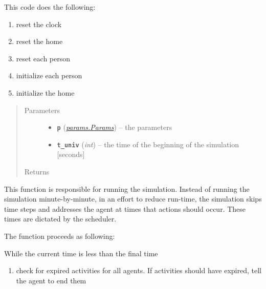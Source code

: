 \documentclass[letterpaper,10pt,english]{sphinxmanual}
\begin{document}
\begin{fulllineitems}
\begin{fulllineitems}
This code does the following:
\begin{enumerate}
\item {} 
reset the clock

\item {} 
reset the home

\item {} 
reset each person

\item {} 
initialize each person

\item {} 
initialize the home

\end{enumerate}
\begin{quote}\begin{description}
\item[{Parameters}] \leavevmode\begin{itemize}
\item {} 
\textbf{\texttt{p}} ({\hyperref[params:params.Params]{\emph{\emph{params.Params}}}}) -- the parameters

\item {} 
\textbf{\texttt{t\_univ}} (\emph{int}) -- the time of the beginning of the simulation {[}seconds{]}

\end{itemize}

\item[{Returns}] \leavevmode


\end{description}\end{quote}

\end{fulllineitems}


\begin{fulllineitems}
\label{universe:universe.Universe.run}
This function is responsible for running the simulation. Instead of running the simulation minute-by-minute,         in an effort to reduce run-time, the simulation skips time steps and addresses the agent at times that         actions should occur. These times are dictated by the scheduler.

The function proceeds as following:

While the current time is less than the final time
\begin{enumerate}
\item {} 
check for expired activities for all agents. If activities should have expired, tell the agent to end them


\end{enumerate}
\end{fulllineitems}
\end{fulllineitems}
\end{document}
